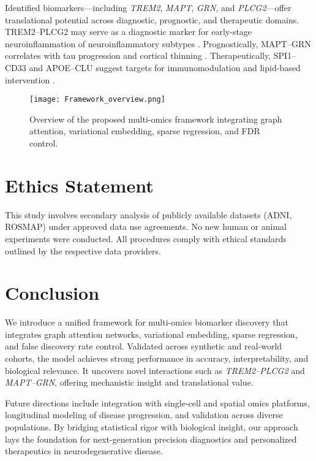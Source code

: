 \documentclass[12pt]{article}
\begin{document}
Identified biomarkers—including \textit{TREM2}, \textit{MAPT}, \textit{GRN}, and \textit{PLCG2}—offer translational potential across diagnostic, prognostic, and therapeutic domains. TREM2–PLCG2 may serve as a diagnostic marker for early-stage neuroinflammation of neuroinflammatory subtypes \citep{suarez2022trem2}. Prognostically, MAPT–GRN correlates with tau progression and cortical thinning \citep{petkau2016grn, bevan2020mapt}. Therapeutically, SPI1–CD33 and APOE–CLU suggest targets for immunomodulation and lipid-based intervention \citep{booth2023cd33, zhou2022apoe}.

\begin{figure}[H]
\centering
\texttt{[image: Framework\_overview.png]}
\caption{Overview of the proposed multi-omics framework integrating graph attention, variational embedding, sparse regression, and FDR control.}
\label{fig:framework_overview}
\end{figure}

\section*{Ethics Statement}

This study involves secondary analysis of publicly available datasets (ADNI, ROSMAP) under approved data use agreements. No new human or animal experiments were conducted. All procedures comply with ethical standards outlined by the respective data providers.

\section{Conclusion}

We introduce a unified framework for multi-omics biomarker discovery that integrates graph attention networks, variational embedding, sparse regression, and false discovery rate control. Validated across synthetic and real-world cohorts, the model achieves strong performance in accuracy, interpretability, and biological relevance. It uncovers novel interactions such as \textit{TREM2–PLCG2} and \textit{MAPT–GRN}, offering mechanistic insight and translational value.

Future directions include integration with single-cell and spatial omics platforms, longitudinal modeling of disease progression, and validation across diverse populations. By bridging statistical rigor with biological insight, our approach lays the foundation for next-generation precision diagnostics and personalized therapeutics in neurodegenerative disease.


\end{document}
